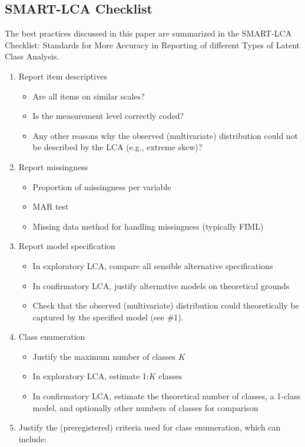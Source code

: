 \documentclass[
  ,man,floatsintext]{apa6}
\providecommand{\tightlist}{%
  \setlength{\itemsep}{0pt}\setlength{\parskip}{0pt}}
\begin{document}
\hypertarget{smart-lca-checklist}{%
\subsection{SMART-LCA Checklist}\label{smart-lca-checklist}}

The best practices discussed in this paper are summarized in the
SMART-LCA Checklist: Standards for More Accuracy in Reporting of
different Types of Latent Class Analysis.

\begin{enumerate}
\def\labelenumi{\arabic{enumi}.}
\tightlist
\item
  Report item descriptives

  \begin{itemize}
  \tightlist
  \item
    Are all items on similar scales?
  \item
    Is the measurement level correctly coded?
  \item
    Any other reasons why the observed (multivariate) distribution
    could not be described by the LCA (e.g., extreme skew)?
  \end{itemize}
\item
  Report missingness

  \begin{itemize}
  \tightlist
  \item
    Proportion of missingness per variable
  \item
    MAR test
  \item
    Missing data method for handling missingness (typically FIML)
  \end{itemize}
\item
  Report model specification

  \begin{itemize}
  \tightlist
  \item
    In exploratory LCA, compare all sensible alternative
    specifications
  \item
    In confirmatory LCA, justify alternative models on theoretical
    grounds
  \item
    Check that the observed (multivariate) distribution could
    theoretically be captured by the specified model (see \#1).
  \end{itemize}
\item
  Class enumeration

  \begin{itemize}
  \tightlist
  \item
    Justify the maximum number of classes \(K\)
  \item
    In exploratory LCA, estimate 1:\(K\) classes
  \item
    In confirmatory LCA, estimate the theoretical number of classes,
    a 1-class model, and optionally other numbers of classes for
    comparison
  \end{itemize}
\item
  Justify the (preregistered) criteria used for class enumeration,
  which can include:


\end{enumerate}
\end{document}
